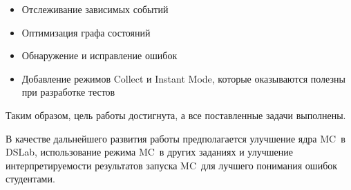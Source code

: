 \documentclass[a4paper,12pt]{extarticle}
\newcommand{\mc}[0]{MC}
\begin{document}
\begin{itemize}
    \item Отслеживание зависимых событий
    \item Оптимизация графа состояний
    \item Обнаружение и исправление ошибок
    \item Добавление режимов Collect и Instant Mode, которые оказываются полезны при разработке тестов
\end{itemize}

Таким образом, цель работы достигнута, а все поставленные задачи выполнены.  

В качестве дальнейшего развития работы предполагается улучшение ядра \mc\ в DSLab, использование режима \mc\ в других заданиях и улучшение интерпретируемости результатов запуска \mc\ для лучшего понимания ошибок студентами.

\end{document}
